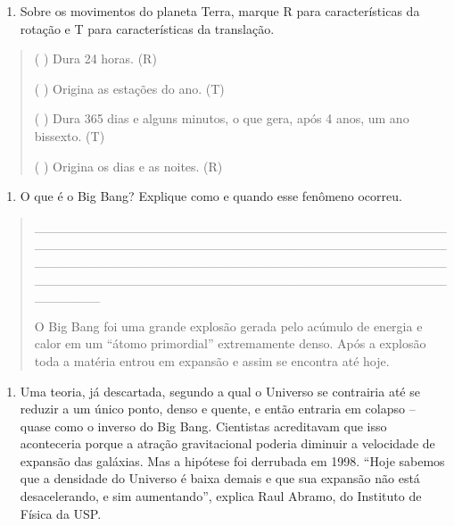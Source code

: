 \begin{enumerate}
\def\labelenumi{\arabic{enumi}.}
\item
  Sobre os movimentos do planeta Terra, marque R para características da
  rotação e T para características da translação.
\end{enumerate}

\begin{quote}
( ) Dura 24 horas. (R)

( ) Origina as estações do ano. (T)

( ) Dura 365 dias e alguns minutos, o que gera, após 4 anos, um ano
bissexto. (T)

( ) Origina os dias e as noites. (R)
\end{quote}

\begin{enumerate}
\def\labelenumi{\arabic{enumi}.}
\item
  O que é o Big Bang? Explique como e quando esse fenômeno ocorreu.
\end{enumerate}

\begin{quote}
\_\_\_\_\_\_\_\_\_\_\_\_\_\_\_\_\_\_\_\_\_\_\_\_\_\_\_\_\_\_\_\_\_\_\_\_\_\_\_\_\_\_\_\_\_\_\_\_\_\_\_\_\_\_\_\_\_\_\_\_\_\_\_\_\_\_\_\_\_\_\_\_\_\_\_\_\_\_\_\_\_\_\_\_\_\_\_\_\_\_\_\_\_\_\_\_\_\_\_\_\_\_\_\_\_\_\_\_\_\_\_\_\_\_\_\_\_\_\_\_\_\_\_\_\_\_\_\_\_\_\_\_\_\_\_\_\_\_\_\_\_\_\_\_\_\_\_\_\_\_\_\_\_\_\_\_\_\_\_\_\_\_\_\_\_\_\_\_\_\_\_\_\_\_\_\_\_\_\_\_\_\_\_

O Big Bang foi uma grande explosão gerada pelo acúmulo de energia e
calor em um ``átomo primordial'' extremamente denso. Após a explosão
toda a matéria entrou em expansão e assim se encontra até hoje.
\end{quote}

\begin{enumerate}
\def\labelenumi{\arabic{enumi}.}
\item
  Uma teoria, já descartada, segundo a qual o Universo se contrairia até
  se reduzir a um único ponto, denso e quente, e então entraria em
  colapso -- quase como o inverso do Big Bang. Cientistas acreditavam
  que isso aconteceria porque a atração gravitacional poderia diminuir a
  velocidade de expansão das galáxias. Mas a hipótese foi derrubada em
  1998. ``Hoje sabemos que a densidade do Universo é baixa demais e que
  sua expansão não está desacelerando, e sim aumentando'', explica Raul
  Abramo, do Instituto de Física da USP.
\end{enumerate}

